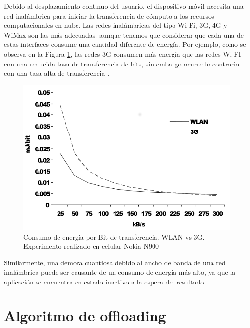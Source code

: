  Debido al desplazamiento continuo del usuario, el dispositivo móvil necesita una red inalámbrica para iniciar la transferencia de cómputo a los 
 recursos computacionales en nube. Las redes inalámbricas del tipo Wi-Fi, 3G, 4G y WiMax son las más adecuadas, aunque tenemos que 
 considerar que cada una de estas interfaces consume una cantidad diferente de energía. Por ejemplo, como se observa en 
 la Figura \ref{fig:energyConsumption}, las redes 3G consumen más energía que las 
 redes Wi-FI con una reducida tasa de transferencia de bits, sin embargo ocurre lo contrario con una tasa alta
 de transferencia
 \cite{miettinen2010energy}. 
 
 \begin{figure}
   \centering
 \includegraphics[scale=0.35]{Figures/energyConsumption.png}
 \caption{Consumo de energía por Bit de transferencia. WLAN vs 3G. Experimento realizado en celular Nokia N900 \cite{miettinen2010energy}}
 \label{fig:energyConsumption}
 \end{figure}

 
 Similarmente, una demora cuantiosa debido al ancho de banda de una red inalámbrica puede ser causante de un consumo de energía más alto, ya
 que la aplicación  se encuentra en estado inactivo a la espera del resultado.
 
 \section{Algoritmo de offloading }
\label{sec:offloadingAlgorithm}

